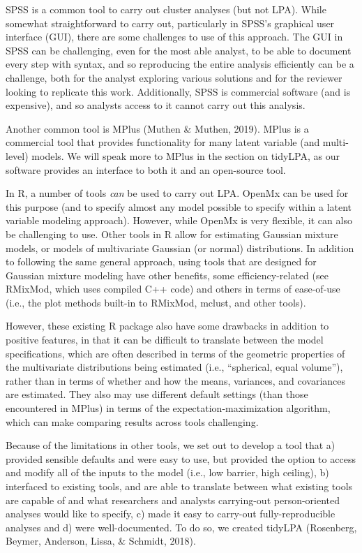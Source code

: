 \documentclass[man]{apa6}
\begin{document}
SPSS is a common tool to carry out cluster analyses (but not LPA). While
somewhat straightforward to carry out, particularly in SPSS's graphical user
interface (GUI), there are some challenges to use of this approach. The GUI in
SPSS can be challenging, even for the most able analyst, to be able to document
every step with syntax, and so reproducing the entire analysis efficiently can
be a challenge, both for the analyst exploring various solutions and for the
reviewer looking to replicate this work. Additionally, SPSS is commercial
software (and is expensive), and so analysts access to it cannot carry out this
analysis.

Another common tool is MPlus (Muthen \& Muthen, 2019). MPlus is a commercial tool
that provides functionality for many latent variable (and multi-level) models.
We will speak more to MPlus in the section on tidyLPA, as our software provides
an interface to both it and an open-source tool.

In R, a number of tools \emph{can} be used to carry out LPA. OpenMx can be used for
this purpose (and to specify almost any model possible to specify within a
latent variable modeling approach). However, while OpenMx is very flexible, it
can also be challenging to use. Other tools in R allow for estimating Gaussian
mixture models, or models of multivariate Gaussian (or normal) distributions. In
addition to following the same general approach, using tools that are designed
for Gaussian mixture modeling have other benefits, some efficiency-related (see
RMixMod, which uses compiled C++ code) and others in terms of ease-of-use (i.e.,
the plot methods built-in to RMixMod, mclust, and other tools).

However, these existing R package also have some drawbacks in addition to positive features, in that it can be difficult to translate between the model specifications, which are often described in terms of the geometric
properties of the multivariate distributions being estimated (i.e., \enquote{spherical,
equal volume}), rather than in terms of whether and how the means, variances,
and covariances are estimated. They also may use different default settings
(than those encountered in MPlus) in terms of the expectation-maximization
algorithm, which can make comparing results across tools challenging.

Because of the limitations in other tools, we set out to develop a tool that a)
provided sensible defaults and were easy to use, but provided the option to
access and modify all of the inputs to the model (i.e., low barrier, high
ceiling), b) interfaced to existing tools, and are able to translate between
what existing tools are capable of and what researchers and analysts
carrying-out person-oriented analyses would like to specify, c) made it easy to
carry-out fully-reproducible analyses and d) were well-documented. To do so, we
created tidyLPA (Rosenberg, Beymer, Anderson, Lissa, \& Schmidt, 2018).
\end{document}
